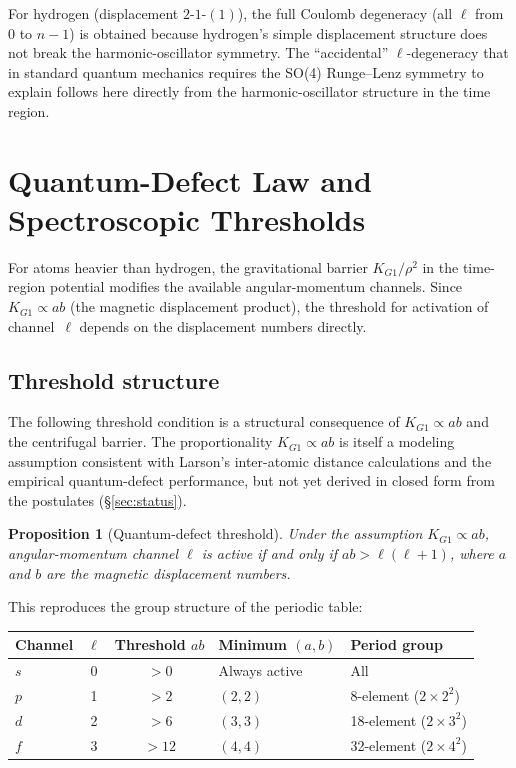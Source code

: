 \documentclass[11pt,a4paper]{article}
\newtheorem{proposition}[theorem]{Proposition}
\begin{document}
For hydrogen (displacement $2$-$1$-$(1)$), the full Coulomb degeneracy (all $\ell$ from $0$ to $n-1$) is obtained because hydrogen's simple displacement structure does not break the harmonic-oscillator symmetry. The ``accidental'' $\ell$-degeneracy that in standard quantum mechanics requires the SO(4) Runge--Lenz symmetry to explain follows here directly from the harmonic-oscillator structure in the time region.

\section{Quantum-Defect Law and Spectroscopic Thresholds}
\label{sec:quantum-defect}

For atoms heavier than hydrogen, the gravitational barrier $K_{G1}/\rho^2$ in the time-region potential modifies the available angular-momentum channels. Since $K_{G1} \propto ab$ (the magnetic displacement product), the threshold for activation of channel~$\ell$ depends on the displacement numbers directly.

\subsection{Threshold structure}

The following threshold condition is a structural consequence of $K_{G1} \propto ab$ and the centrifugal barrier. The proportionality $K_{G1} \propto ab$ is itself a modeling assumption consistent with Larson's inter-atomic distance calculations and the empirical quantum-defect performance, but not yet derived in closed form from the postulates (\S\ref{sec:status}).

\begin{proposition}[Quantum-defect threshold]
\label{prop:threshold}
Under the assumption $K_{G1} \propto ab$, angular-momentum channel $\ell$ is active if and only if $ab > \ell(\ell+1)$, where $a$ and $b$ are the magnetic displacement numbers.
\end{proposition}

This reproduces the group structure of the periodic table:

\begin{center}
\begin{tabular}{lccll}
\toprule
Channel & $\ell$ & Threshold $ab$ & Minimum $(a,b)$ & Period group \\
\midrule
$s$ & 0 & $>0$ & Always active & All \\
$p$ & 1 & $>2$ & $(2,2)$ & 8-element ($2 \times 2^2$) \\
$d$ & 2 & $>6$ & $(3,3)$ & 18-element ($2 \times 3^2$) \\
$f$ & 3 & $>12$ & $(4,4)$ & 32-element ($2 \times 4^2$) \\
\bottomrule
\end{tabular}
\end{center}
\end{document}
